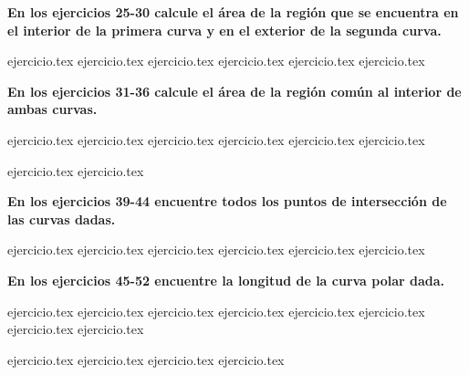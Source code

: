 \vspace{0.3cm}
\noindent\textbf{En los ejercicios 25-30 calcule el área de la región que se encuentra en el interior de la primera curva y en el exterior de la segunda curva.}
\begin{enumerate}
    \setcounter{enumi}{24}
    {ejercicio.tex}
{ejercicio.tex}
{ejercicio.tex}
{ejercicio.tex}
{ejercicio.tex}
{ejercicio.tex}
\end{enumerate}

\vspace{0.3cm}
\noindent\textbf{En los ejercicios 31-36 calcule el área de la región común al interior de ambas curvas.}
\begin{enumerate}
    \setcounter{enumi}{30}
    {ejercicio.tex}
{ejercicio.tex}
{ejercicio.tex}
{ejercicio.tex}
{ejercicio.tex}
{ejercicio.tex}
\end{enumerate}

\vspace{0.3cm}
\begin{enumerate}
    \setcounter{enumi}{36}
    {ejercicio.tex}
{ejercicio.tex}
\end{enumerate}

\vspace{0.3cm}
\noindent\textbf{En los ejercicios 39-44 encuentre todos los puntos de intersección de las curvas dadas.}
\begin{enumerate}
    \setcounter{enumi}{38}
    {ejercicio.tex}
{ejercicio.tex}
{ejercicio.tex}
{ejercicio.tex}
{ejercicio.tex}
{ejercicio.tex}
\end{enumerate}

\vspace{0.3cm}
\noindent\textbf{En los ejercicios 45-52 encuentre la longitud de la curva polar dada.}
\begin{enumerate}
    \setcounter{enumi}{44}
    {ejercicio.tex}
{ejercicio.tex}
{ejercicio.tex}
{ejercicio.tex}
{ejercicio.tex}
{ejercicio.tex}
{ejercicio.tex}
{ejercicio.tex}
\end{enumerate}

\vspace{0.3cm}
\begin{enumerate}
    \setcounter{enumi}{52}
    {ejercicio.tex}
{ejercicio.tex}
{ejercicio.tex}
{ejercicio.tex}
\end{enumerate}
